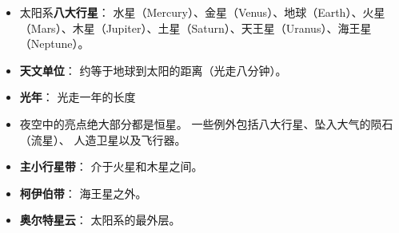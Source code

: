 
\begin{issues}
\issueDraft
\end{issues}

\begin{itemize}
\item 太阳系\textbf{八大行星}： 水星（Mercury）、金星（Venus）、地球（Earth）、火星（Mars）、木星（Jupiter）、土星（Saturn）、天王星（Uranus）、海王星（Neptune）。
\item \textbf{天文单位}： 约等于地球到太阳的距离（光走八分钟）。
\item \textbf{光年}： 光走一年的长度
\item 夜空中的亮点绝大部分都是恒星。 一些例外包括八大行星、坠入大气的陨石（流星）、 人造卫星以及飞行器。
\item \textbf{主小行星带}： 介于火星和木星之间。
\item \textbf{柯伊伯带}： 海王星之外。
\item \textbf{奥尔特星云}： 太阳系的最外层。
\end{itemize}
